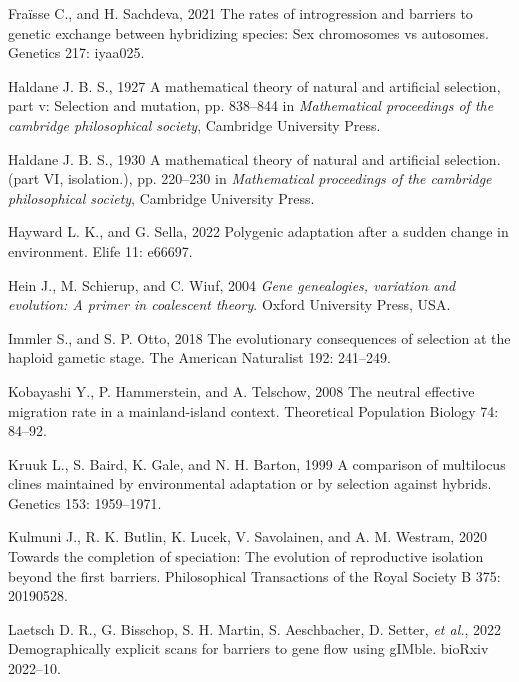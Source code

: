 \documentclass[
  11pt,
]{article}
\newlength{\cslhangindent}
\newlength{\cslentryspacingunit} %
\newenvironment{CSLReferences}[2] %
 {%
  \setlength{\parindent}{0pt}
  \ifodd #1
  \let\oldpar\par
  \def\par{\hangindent=\cslhangindent\oldpar}
  \fi
  \setlength{\parskip}{#2\cslentryspacingunit}
 }%
 {}
\begin{document}
\begin{CSLReferences}{1}{0}
\leavevmode{}%
Fraïsse C., and H. Sachdeva, 2021 The rates of introgression and
barriers to genetic exchange between hybridizing species: Sex
chromosomes vs autosomes. Genetics 217: iyaa025.

\leavevmode{}%
Haldane J. B. S., 1927 A mathematical theory of natural and artificial
selection, part v: Selection and mutation, pp. 838--844 in
\emph{Mathematical proceedings of the cambridge philosophical society},
Cambridge University Press.

\leavevmode{}%
Haldane J. B. S., 1930 A mathematical theory of natural and artificial
selection.(part VI, isolation.), pp. 220--230 in \emph{Mathematical
proceedings of the cambridge philosophical society}, Cambridge
University Press.

\leavevmode{}%
Hayward L. K., and G. Sella, 2022 Polygenic adaptation after a sudden
change in environment. Elife 11: e66697.

\leavevmode{}%
Hein J., M. Schierup, and C. Wiuf, 2004 \emph{Gene genealogies,
variation and evolution: A primer in coalescent theory}. Oxford
University Press, USA.

\leavevmode{}%
Immler S., and S. P. Otto, 2018 The evolutionary consequences of
selection at the haploid gametic stage. The American Naturalist 192:
241--249.

\leavevmode{}%
Kobayashi Y., P. Hammerstein, and A. Telschow, 2008 The neutral
effective migration rate in a mainland-island context. Theoretical
Population Biology 74: 84--92.

\leavevmode{}%
Kruuk L., S. Baird, K. Gale, and N. H. Barton, 1999 A comparison of
multilocus clines maintained by environmental adaptation or by selection
against hybrids. Genetics 153: 1959--1971.

\leavevmode{}%
Kulmuni J., R. K. Butlin, K. Lucek, V. Savolainen, and A. M. Westram,
2020 Towards the completion of speciation: The evolution of reproductive
isolation beyond the first barriers. Philosophical Transactions of the
Royal Society B 375: 20190528.

\leavevmode{}%
Laetsch D. R., G. Bisschop, S. H. Martin, S. Aeschbacher, D. Setter,
\emph{et al.}, 2022 Demographically explicit scans for barriers to gene
flow using gIMble. bioRxiv 2022--10.


\end{CSLReferences}
\end{document}
